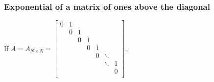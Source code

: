 \documentclass[letterpaper,10pt,english]{jupyterBook}
\begin{document}
\subsubsection{Exponential of a matrix of ones above the diagonal}
\label{\detokenize{cap3:exponential-of-a-matrix-of-ones-above-the-diagonal}}
\sphinxAtStartPar
If \(A = A_{N \times N} =   
\left[ {\begin{array}{ccccccc}
    0 & 1 &  &  &  &  & \\
     & 0 & 1 &  &  &  &\\
     &  & 0 & 1 &  &  &\\
     &  &  & 0 & 1 &  &\\
     &  &  &  & 0 & \ddots &  \\
     &  &  &  &  & \ddots & 1 \\
     &  &  &  &  &  & 0 \\
\end{array} } \right] \),
\end{document}
